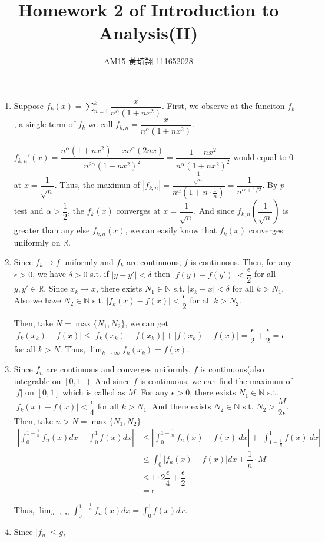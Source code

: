 \documentclass[12pt]{article}
\title{Homework 2 of Introduction to Analysis(II)}
\author{AM15 黃琦翔 111652028}
\begin{document}
\maketitle
\begin{enumerate}
    \item Suppose $f_k(x) = \displaystyle\sum_{n=1}^{k} \dfrac{x}{n^\alpha (1+nx^2)}$.
    First, we observe at the funciton $f_k$, a single term of $f_k$ we call $f_{k, n} = \dfrac{x}{n^{\alpha}(1+nx^2)}$.

    $f_{k, n}'(x) = \dfrac{n^{\alpha}(1+nx^2) - xn^{\alpha}(2nx)}{n^{2\alpha}(1+nx^2)^2} = \dfrac{1-nx^2}{n^{\alpha}(1+nx^2)^2}$ would equal to $0$ at $x = \dfrac{1}{\sqrt{n}}$.
    Thus, the maximun of $|f_{k, n}| = \dfrac{\frac{1}{\sqrt{n}}}{n^{\alpha}(1 + n \cdot \frac{1}{n})} = \dfrac{1}{n^{\alpha + 1/2}}$.
    By $p$-test and $\alpha> \dfrac{1}{2}$, the $f_k(x)$ converges at $x = \dfrac{1}{\sqrt{n}}$.
    And since $f_{k, n}(\dfrac{1}{\sqrt{n}})$ is greater than any else $f_{k, n}(x)$, 
    we can easily know that $f_k(x)$ converges uniformly on $\mathbb{R}$.

    \item Since $f_k \to f$ uniformly and $f_k$ are continuous, $f$ is continuous.
    Then, for any $\epsilon > 0$, we have $\delta > 0 $ s.t. if $|y - y'| < \delta$ then $|f(y) - f(y')| < \dfrac{\epsilon}{2}$ for all $y, y' \in \mathbb{R}$.
    Since $x_k \to x$, there exists $N_1 \in \mathbb{N}$ s.t. $|x_k - x| < \delta$ for all $k > N_1$.
    Also we have $N_2 \in \mathbb{N}$ s.t. $|f_k(x) - f(x)| < \dfrac{\epsilon}{2}$ for all $k > N_2$.

    Then, take $N  = \max\{ N_1, N_2\}$, we can get $|f_k(x_k) - f(x)| \leq |f_k(x_k) - f(x_k)| + |f(x_k) - f(x)| = \dfrac{\epsilon}{2} + \dfrac{\epsilon}{2} = \epsilon$ for all $k > N$.
    Thus, $\displaystyle\lim_{k\to\infty} f_k(x_k) = f(x)$.

    \item Since $f_n$ are continuous and converges uniformly, $f$ is continuous(also integrable on $[0, 1]$).
    And since $f$ is continuous, we can find the maximun of $|f|$ on $[0, 1]$ which is called as $M$.
    For any $\epsilon > 0$, there exists $N_1 \in \mathbb{N}$ s.t. $|f_k(x) - f(x)| < \dfrac{\epsilon}{4}$ for all $k > N_1$.
    And there exists $N_2 \in \mathbb{N}$ s.t. $N_2 > \dfrac{M}{2\epsilon}$.
    Then, take $n > N = \max\{N_1, N_2\}$ \begin{align*}
        \left|\int_0^{1-\frac{1}{n}} f_n(x) dx - \int_0^1 f(x) dx\right| &\leq \left|\int_{0}^{1-\frac{1}{n}} f_n(x) - f(x)\ dx\right| + \left|\int_{1-\frac{1}{n}}^{1} f(x)\ dx\right|\\
        &\leq \int_0^1 |f_k(x) - f(x)| dx + \dfrac{1}{n} \cdot M\\
        &\leq 1 \cdot 2\dfrac{\epsilon}{4} + \dfrac{\epsilon}{2}\\
        &= \epsilon
    \end{align*}

    Thus, $\displaystyle\lim_{n\to\infty} \displaystyle\int_{0}^{1-\frac{1}{n}} f_n(x) dx = \displaystyle\int_0^1 f(x) dx$.

    \item Since $|f_n| \leq g$, 
\end{enumerate}
\end{document}
